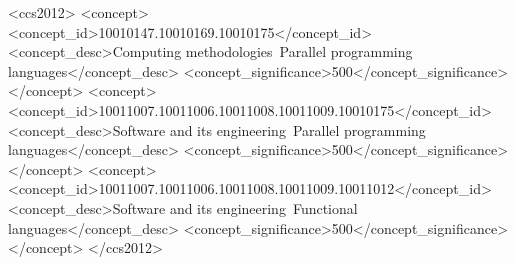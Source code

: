 \documentclass[sigplan,table]{acmart}
\begin{document}
%
%
\begin{CCSXML}
<ccs2012>
<concept>
<concept_id>10010147.10010169.10010175</concept_id>
<concept_desc>Computing methodologies~Parallel programming languages</concept_desc>
<concept_significance>500</concept_significance>
</concept>
<concept>
<concept_id>10011007.10011006.10011008.10011009.10010175</concept_id>
<concept_desc>Software and its engineering~Parallel programming languages</concept_desc>
<concept_significance>500</concept_significance>
</concept>
<concept>
<concept_id>10011007.10011006.10011008.10011009.10011012</concept_id>
<concept_desc>Software and its engineering~Functional languages</concept_desc>
<concept_significance>500</concept_significance>
</concept>
</ccs2012>
\end{CCSXML}




\maketitle





\end{document}
